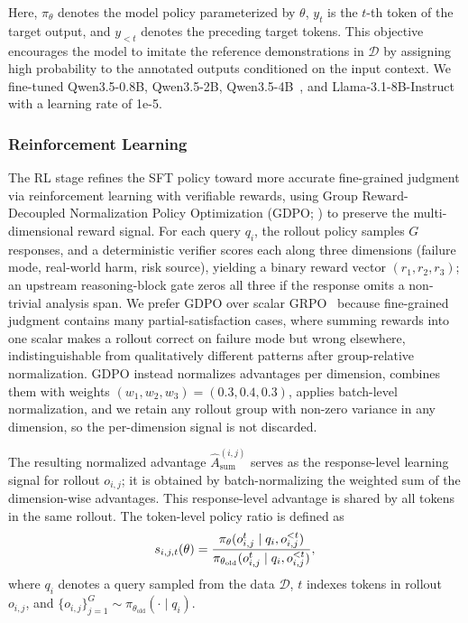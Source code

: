 Here, $\pi_\theta$ denotes the model policy parameterized by $\theta$,
$y_t$ is the $t$-th token of the target output, and $y_{<t}$ denotes the
preceding target tokens. This objective encourages the model to imitate
the reference demonstrations in $\mathcal{D}$ by assigning high
probability to the annotated outputs conditioned on the input context. We fine-tuned Qwen3.5-0.8B, Qwen3.5-2B, Qwen3.5-4B~\citep{qwen35}, and Llama-3.1-8B-Instruct~\citep{dubey2024llama} with a learning rate of 1e-5.

\subsubsection{Reinforcement Learning}
\label{sec:rl}

The RL stage refines the SFT policy toward more accurate fine-grained judgment via reinforcement learning with verifiable rewards, using Group Reward-Decoupled Normalization Policy Optimization (GDPO; \citealp{liu2026gdpo}) to preserve the multi-dimensional reward signal. For each query $q_i$, the rollout policy samples $G$ responses, and a deterministic verifier scores each along three dimensions (failure mode, real-world harm, risk source), yielding a binary reward vector $(r_1,r_2,r_3)$; an upstream reasoning-block gate zeros all three if the response omits a non-trivial analysis span. We prefer GDPO over scalar GRPO~\citep{shao2024deepseekmath} because fine-grained judgment contains many partial-satisfaction cases, where summing rewards into one scalar makes a rollout correct on failure mode but wrong elsewhere, indistinguishable from qualitatively different patterns after group-relative normalization. GDPO instead normalizes advantages per dimension, combines them with weights $(w_1,w_2,w_3)=(0.3,0.4,0.3)$, applies batch-level normalization, and we retain any rollout group with non-zero variance in any dimension, so the per-dimension signal is not discarded.

The resulting normalized advantage
$\hat A_{\mathrm{sum}}^{(i,j)}$ serves as the response-level learning
signal for rollout $o_{i,j}$; it is obtained by batch-normalizing the
weighted sum of the dimension-wise advantages. This response-level
advantage is shared by all tokens in the same rollout. The token-level
policy ratio is defined as
\begin{equation}
\small
s_{i,j,t}(\theta)
=
\frac{
\pi_\theta(o_{i,j}^{t}\mid q_i,o_{i,j}^{<t})
}{
\pi_{\theta_{\mathrm{old}}}(o_{i,j}^{t}\mid q_i,o_{i,j}^{<t})
},
\label{eq:policy-ratio}
\end{equation}
where $q_i$ denotes a query sampled from the data
$\mathcal{D}$, $t$ indexes tokens in rollout $o_{i,j}$, and
$\{o_{i,j}\}_{j=1}^{G}\sim\pi_{\theta_{\mathrm{old}}}(\cdot\mid q_i)$.

